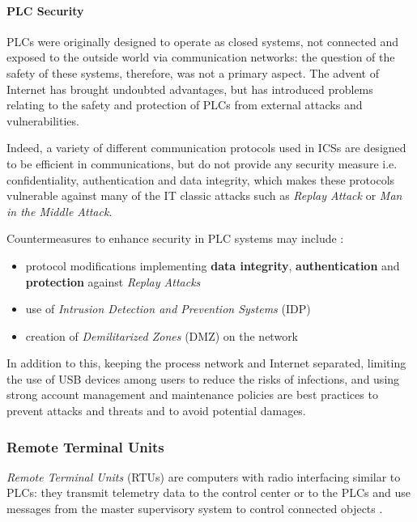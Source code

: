 \paragraph{PLC Security}
\label{subsubsec:2_plc_security}
PLCs were originally designed to operate as closed systems, not connected and exposed to the outside world via communication networks: the question of the safety of these systems, therefore, was not a primary aspect. The advent of  Internet has brought undoubted advantages, but has introduced problems relating to the safety and protection of PLCs from external attacks and vulnerabilities.

Indeed, a variety of different communication protocols used in ICSs are designed to be efficient in communications, but do not provide any security measure i.e. confidentiality, authentication and data integrity, which makes these protocols vulnerable against many of the IT classic attacks such as \textit{Replay Attack} or \textit{Man in the Middle Attack}. 

\bigskip
Countermeasures to enhance security in PLC systems may include \cite{plc_security}:

\begin{itemize}
	\item protocol modifications implementing \textbf{data integrity}, \textbf{authentication} and \textbf{protection} against \textit{Replay Attacks}
	
	\item use of \textit{Intrusion Detection and Prevention Systems} (IDP) 
	
	\item creation of \textit{Demilitarized Zones} (DMZ) on the network
\end{itemize}

In addition to this, keeping the process network and Internet separated, limiting the use of USB devices among users to reduce the risks of infections, and using strong account management and maintenance policies are best practices to prevent attacks and threats and to avoid potential damages. 

\subsubsection{Remote Terminal Units}
\label{subsubsec:2_rtu}
\textit{Remote Terminal Units} (RTUs) are computers with radio interfacing similar to PLCs: they transmit telemetry data to the control center or to the PLCs and use messages from the master supervisory system to control connected objects \cite{rtu_definition}.

